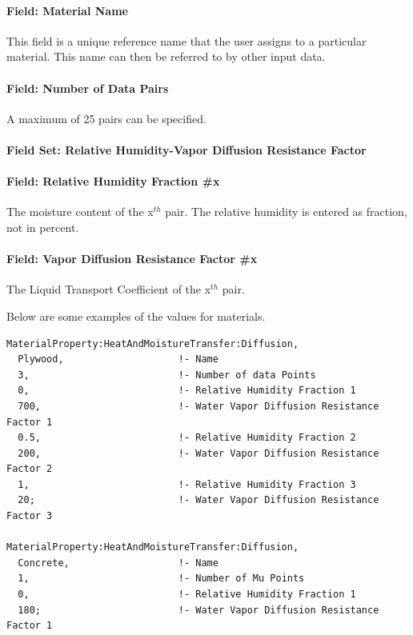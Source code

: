 \paragraph{Field: Material Name}\label{field-material-name-4}

This field is a unique reference name that the user assigns to a particular material. This name can then be referred to by other input data.

\paragraph{Field: Number of Data Pairs}\label{field-number-of-data-pairs}

A maximum of 25 pairs can be specified.

\paragraph{Field Set: Relative Humidity-Vapor Diffusion Resistance Factor}\label{field-set-relative-humidity-vapor-diffusion-resistance-factor}

\paragraph{Field: Relative Humidity Fraction \#x}\label{field-relative-humidity-fraction-x-1}

The moisture content of the x\(^{th}\) pair. The relative humidity is entered as fraction, not in percent.

\paragraph{Field: Vapor Diffusion Resistance Factor \#x}\label{field-vapor-diffusion-resistance-factor-x}

The Liquid Transport Coefficient of the x\(^{th}\) pair.

Below are some examples of the values for materials.

\begin{lstlisting}
MaterialProperty:HeatAndMoistureTransfer:Diffusion,
  Plywood,                    !- Name
  3,                          !- Number of data Points
  0,                          !- Relative Humidity Fraction 1
  700,                        !- Water Vapor Diffusion Resistance Factor 1
  0.5,                        !- Relative Humidity Fraction 2
  200,                        !- Water Vapor Diffusion Resistance Factor 2
  1,                          !- Relative Humidity Fraction 3
  20;                         !- Water Vapor Diffusion Resistance Factor 3

MaterialProperty:HeatAndMoistureTransfer:Diffusion,
  Concrete,                   !- Name
  1,                          !- Number of Mu Points
  0,                          !- Relative Humidity Fraction 1
  180;                        !- Water Vapor Diffusion Resistance Factor 1
\end{lstlisting}

